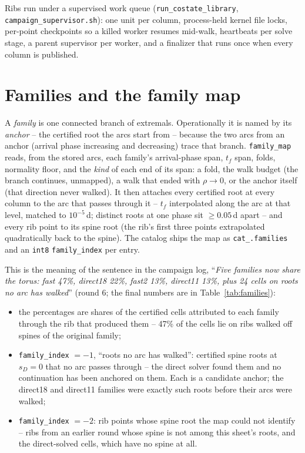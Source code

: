 \documentclass[11pt]{article}
\newcommand{\sD}{s_D}
\newcommand{\tf}{t_f}
\newcommand{\code}[1]{\texttt{#1}}
\begin{document}
Ribs run under a supervised work queue (\code{run\_costate\_library},
\code{campaign\_supervisor.sh}): one unit per column, process-held kernel
file locks, per-point checkpoints so a killed worker resumes mid-walk,
heartbeats per solve stage, a parent supervisor per worker, and a
finalizer that runs once when every column is published.

\section{Families and the family map}
\label{sec:families}

A \emph{family} is one connected branch of extremals. Operationally it is
named by its \emph{anchor} -- the certified root the arcs start from --
because the two arcs from an anchor (arrival phase increasing and
decreasing) trace that branch. \code{family\_map} reads, from the stored
arcs, each family's arrival-phase span, $\tf$ span, folds, normality
floor, and the \emph{kind} of each end of its span: a fold, the walk
budget (the branch continues, unmapped), a walk that ended with
$\rho\to0$, or the anchor itself (that direction never walked). It then
attaches every certified root at every column to the arc that passes
through it -- $\tf$ interpolated along the arc at that level, matched to
$10^{-5}$\,d; distinct roots at one phase sit $\ge 0.05$\,d apart -- and
every rib point to its spine root (the rib's first three points
extrapolated quadratically back to the spine). The catalog ships the map
as \code{cat\_.families} and an \code{int8} \code{family\_index} per entry.

This is the meaning of the sentence in the campaign log, ``\emph{Five
families now share the torus: fast 47\%, direct18 22\%, fast2 13\%,
direct11 13\%, plus 24 cells on roots no arc has walked}'' (round 6; the
final numbers are in Table~\ref{tab:families}):
\begin{itemize}[nosep]
\item the percentages are shares of the certified cells attributed to
  each family through the rib that produced them -- 47\% of the cells lie
  on ribs walked off spines of the original family;
\item \code{family\_index} $= -1$, ``roots no arc has walked'': certified
  spine roots at $\sD=0$ that no arc passes through -- the direct solver
  found them and no continuation has been anchored on them. Each is a
  candidate anchor; the direct18 and direct11 families were exactly such
  roots before their arcs were walked;
\item \code{family\_index} $= -2$: rib points whose spine root the map
  could not identify -- ribs from an earlier round whose spine is not
  among this sheet's roots, and the direct-solved cells, which have no
  spine at all.
\end{itemize}
\end{document}
